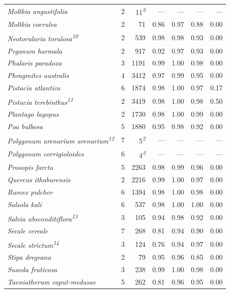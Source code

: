\documentclass[
  authoryear,
  preprint]{elsarticle}
\begin{document}
\begin{longtable}{@{\extracolsep{\fill}}lrrrrrr}
{\itshape Moltkia angustifolia} & 2 & 11\textsuperscript{\textit{2}} & — & — & — & — \\ 
{\itshape Moltkia coerulea} & 2 & 71 & 0.86 & 0.97 & 0.88 & 0.00 \\ 
{\itshape Neotorularia torulosa}\textsuperscript{\textit{10}} & 2 & 539 & 0.98 & 0.98 & 0.93 & 0.00 \\ 
{\itshape Peganum harmala} & 2 & 917 & 0.92 & 0.97 & 0.93 & 0.00 \\ 
{\itshape Phalaris paradoxa} & 3 & 1191 & 0.99 & 1.00 & 0.98 & 0.00 \\ 
{\itshape Phragmites australis} & 4 & 3412 & 0.97 & 0.99 & 0.95 & 0.00 \\ 
{\itshape Pistacia atlantica} & 6 & 1874 & 0.98 & 1.00 & 0.97 & 0.17 \\ 
{\itshape Pistacia terebinthus}\textsuperscript{\textit{11}} & 2 & 3419 & 0.98 & 1.00 & 0.98 & 0.50 \\ 
{\itshape Plantago lagopus} & 2 & 1730 & 0.98 & 1.00 & 0.99 & 0.00 \\ 
{\itshape Poa bulbosa} & 5 & 1880 & 0.95 & 0.98 & 0.92 & 0.00 \\ 
{\itshape Polygonum arenarium arenarium}\textsuperscript{\textit{12}} & 7 & 5\textsuperscript{\textit{2}} & — & — & — & — \\ 
{\itshape Polygonum corrigioloides} & 6 & 4\textsuperscript{\textit{2}} & — & — & — & — \\ 
{\itshape Prosopis farcta} & 5 & 2263 & 0.98 & 0.99 & 0.96 & 0.00 \\ 
{\itshape Quercus ithaburensis} & 2 & 2216 & 0.99 & 1.00 & 0.97 & 0.00 \\ 
{\itshape Rumex pulcher} & 6 & 1394 & 0.98 & 1.00 & 0.98 & 0.00 \\ 
{\itshape Salsola kali} & 6 & 537 & 0.98 & 1.00 & 1.00 & 0.00 \\ 
{\itshape Salvia absconditiflora}\textsuperscript{\textit{13}} & 3 & 105 & 0.94 & 0.98 & 0.92 & 0.00 \\ 
{\itshape Secale cereale} & 7 & 268 & 0.81 & 0.94 & 0.90 & 0.00 \\ 
{\itshape Secale strictum}\textsuperscript{\textit{14}} & 3 & 124 & 0.76 & 0.94 & 0.97 & 0.00 \\ 
{\itshape Stipa dregeana} & 2 & 79 & 0.95 & 0.96 & 0.85 & 0.00 \\ 
{\itshape Suaeda fruticosa} & 3 & 238 & 0.99 & 1.00 & 0.98 & 0.00 \\ 
{\itshape Taeniatherum caput-medusae} & 5 & 262 & 0.81 & 0.96 & 0.95 & 0.00 \\ 

\end{longtable}
\end{document}
